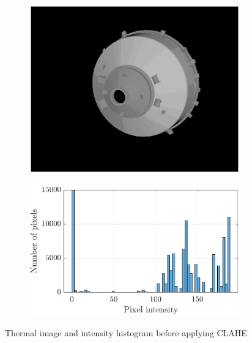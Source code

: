 \begin{figure}[!h]
\captionsetup[subfigure]{labelformat=empty}
\begin{subfigure}[a]{0.42\linewidth}
\centering
    \includegraphics[width=\linewidth]{Images/imgCLAHEbefore.eps}
\end{subfigure}\hfill
\begin{subfigure}[a]{0.55\linewidth}
\centering
    \includegraphics[width=\linewidth]{Images/CLAHEbefore.eps}
\end{subfigure}
    \caption{Thermal image and intensity histogram before applying CLAHE}
    \label{fig:CLAHEbefroe}
\end{figure}
